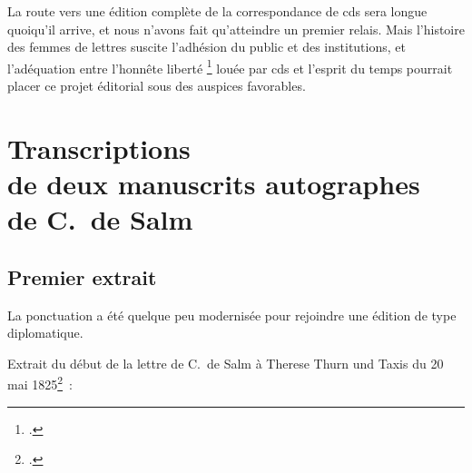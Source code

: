 \documentclass[a4paper,12pt,twoside]{book}
\begin{document}
		La route vers une édition complète de la correspondance de \gls{cds} sera longue quoiqu'il arrive, et nous n'avons fait qu'atteindre un premier relais. Mais l'histoire des femmes de lettres suscite l'adhésion du public et des institutions, et l'adéquation entre l'\og honnête liberté \fg \footcite{CdS02045046} louée par \gls{cds} et l'esprit du temps pourrait placer ce projet éditorial sous des auspices favorables.
		
			
				
	\appendix
	
	\renewcommand{\appendixpagename}{Annexes}
	
	\renewcommand{\appendixtocname}{Annexes}
	
	\addappheadtotoc%
	
	\appendixpage %
	
	\chapter{Transcriptions \\de deux manuscrits autographes \\de C.~de Salm}
		\label{autographes}
		
		\section{Premier extrait}
	
			La ponctuation a été quelque peu modernisée pour rejoindre une édition de type diplomatique.
		
			Extrait du début de la lettre de C.~de Salm à Therese Thurn und Taxis du 20 mai 1825\footcite{CdS67022030}~:
			
\end{document}
